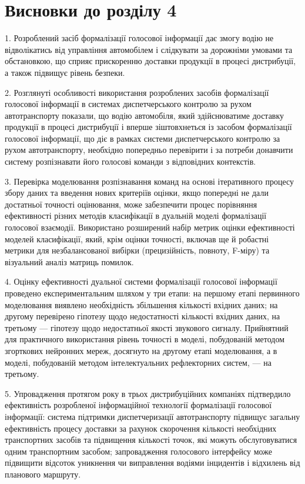 \section*{Висновки до розділу 4}

1. Розроблений засіб формалізації голосової інформації дає змогу водію не відволікатись від управління автомобілем і слідкувати за дорожніми умовами та обстановкою, що сприяє прискоренню доставки продукції в процесі дистрибуції, а також підвищує рівень безпеки.

2. Розглянуті особливості використання розроблених засобів формалізації голосової інформації в системах диспетчерського контролю за рухом автотранспорту показали, що водію автомобіля, який здійснюватиме доставку продукції в процесі дистрибуції і вперше зіштовхнеться із засобом формалізації голосової інформації, що діє в рамках системи диспетчерського контролю за рухом автотранспорту, необхідно попередньо перевірити і за потреби донавчити систему розпізнавати його голосові команди з відповідних контекстів.

3. Перевірка моделювання розпізнавання команд на основі ітеративного процесу збору даних та введення нових критеріїв оцінки, якщо попередні не дали достатньої точності оцінювання, може забезпечити процес порівняння ефективності різних методів класифікації в дуальній моделі формалізації голосової взаємодії.
Використано розширений набір метрик оцінки ефективності моделей класифікації, який, крім оцінки точності, включав ще й робастні метрики для незбалансованої вибірки (прецизійність, повноту, F-міру) та візуальний аналіз матриць помилок.

4. Оцінку ефективності дуальної системи формалізації голосової інформації проведено експериментальним шляхом у три етапи: на першому етапі первинного моделювання виявлено необхідність збільшення кількості вхідних даних; на другому перевірено гіпотезу щодо недостатності кількості вхідних даних, на третьому --- гіпотезу щодо недостатньої якості звукового сигналу. Прийнятний для практичного використання рівень точності в моделі, побудованій методом згорткових нейронних мереж, досягнуто на другому етапі моделювання, а в моделі, побудованій методом інтелектуальних рефлекторних систем, --- на третьому.

5. Упровадження протягом року в трьох дистрибуційних компаніях підтвердило ефективність розробленої інформаційної технології формалізації голосової інформації: система підтримки диспетчеризації автотранспорту підвищує загальну ефективність процесу доставки за рахунок скорочення кількості необхідних транспортних засобів та підвищення кількості точок, які можуть обслуговуватися одним транспортним засобом; запровадження голосового інтерфейсу може підвищити відсоток уникнення чи виправлення водіями інцидентів і відхилень від планового маршруту.
